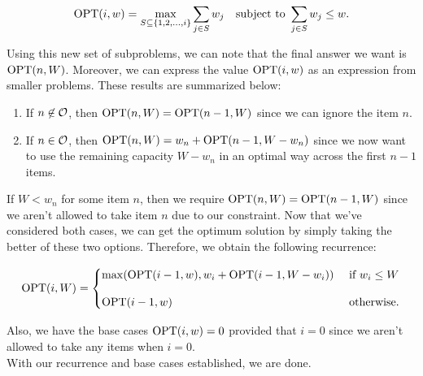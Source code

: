 \[
\operatorname{OPT}(i, w) = \max_{S \subseteq \{1, 2, \ldots, i\}} \sum_{j \in S} w_j \hspace{1em} \text{subject to  } \sum_{j \in S} w_j \leq w.
\]

Using this new set of subproblems, we can note that the final answer we want is $\operatorname{OPT}(n, W)$. Moreover, we can express the value $\operatorname{OPT}(i, w)$ as an expression from smaller problems. These results are summarized below:

\begin{enumerate}
    \item If $n \not \in \mathcal{O}$, then $\operatorname{OPT}(n, W) = \operatorname{OPT}(n - 1, W)$ since we can ignore the item $n$.
    \item If $n\in \mathcal{O}$, then $\operatorname{OPT}(n, W) = w_n + \operatorname{OPT}(n - 1, W - w_n)$ since we now want to use the remaining capacity $W - w_n$ in an optimal way across the first $n - 1$ items.
\end{enumerate}

If $W < w_n$ for some item $n$, then we require $\operatorname{OPT}(n, W) = \operatorname{OPT}(n - 1, W)$ since we aren't allowed to take item $n$ due to our constraint. Now that we've considered both cases, we can get the optimum solution by simply taking the better of these two options. Therefore, we obtain the following recurrence:

\[
\operatorname{OPT}(i, W) = \begin{cases}
\max(\operatorname{OPT}(i - 1, w), w_i + \operatorname{OPT}(i - 1, W - w_i)) & \text{ if } w_i \leq W \\[1em]
\operatorname{OPT}(i - 1, w) & \text{ otherwise.}
\end{cases}
\]

Also, we have the base cases $\operatorname{OPT}(i, w) = 0$ provided that $i = 0$ since we aren't allowed to take any items when $i = 0$. \\

With our recurrence and base cases established, we are done. 